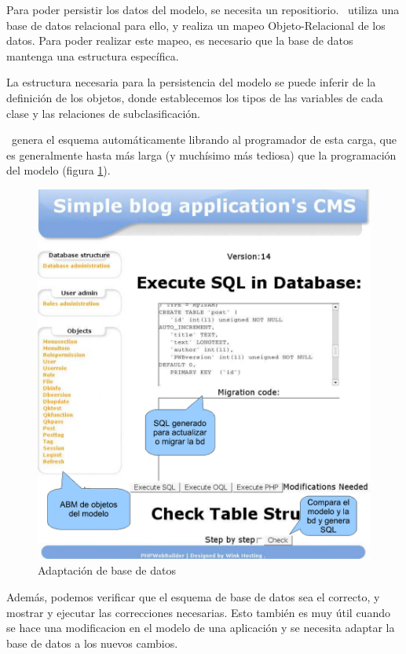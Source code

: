 Para poder persistir los datos del modelo, se necesita un repositiorio. \PWB\ utiliza una base de datos relacional para ello, y realiza un mapeo Objeto-Relacional de los datos. Para poder realizar este mapeo, es necesario que la base de datos mantenga una estructura específica.

La estructura necesaria para la persistencia del modelo se puede inferir de la definición de los objetos, donde establecemos los tipos de las variables de cada clase y las relaciones de subclasificación.

\PWB \ genera el esquema automáticamente librando al programador de esta carga, que es generalmente hasta más larga (y muchísimo más tediosa) que la programación del modelo (figura \ref{fig-admin1}).

\begin{figure}[h]
	\centering
	\includegraphics[scale=0.5]{images/admin2.pdf}
 	\caption{Adaptación de base de datos}
 	\label{fig-admin1}
\end{figure}

Además, podemos verificar que el esquema de base de datos sea el correcto, y mostrar y ejecutar las correcciones necesarias. Esto también es muy útil cuando se hace una modificacion en el modelo de una aplicación y se necesita adaptar la base de datos a los nuevos cambios.

